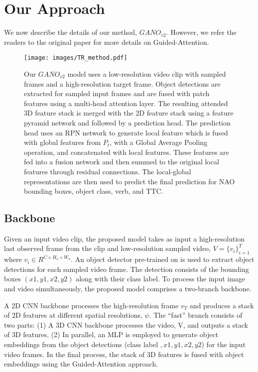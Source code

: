 \documentclass[10pt,twocolumn,letterpaper]{article}
\begin{document}
\section{Our Approach}
\label{sec:pagestyle}
We now describe the details of our method, $GANO_{v2}$. However, we refer the readers to the original paper \cite{gano} for more details on Guided-Attention. 

\begin{figure*}[t!]
\centering
\texttt{[image: images/TR\_method.pdf]}
\caption{Our $GANO_{v2}$ model uses a low-resolution video clip with sampled frames and a high-resolution target frame. Object detections are extracted for sampled input frames and are fused with patch features using a multi-head attention layer. The resulting attended 3D feature stack is merged with the 2D feature stack using a feature pyramid network and followed by a prediction head. The prediction head uses an RPN network to generate local feature which is fused with global features from $P_t$, with a Global Average Pooling operation, and concatenated with local features. These features are fed into a fusion network and then summed to the original local features through residual connections. The local-global representations are then used to predict the final prediction for NAO bounding boxes, object class, verb, and TTC. 
}
\label{fig:method}
\end{figure*}

\subsection{Backbone}
Given an input video clip, the proposed model takes as input a high-resolution last observed frame from the clip and low-resolution sampled video, $V = \{{v_i\}^T_{i=1}}$ where $v_i \in {R}^{C\times{H_o}\times{W_o}}$. An object detector \cite{fastercnn} pre-trained on \cite{ego4d} is used to extract object detections for each sampled video frame. The detection consists of the bounding boxes $(x1, y1, x2, y2)$ along with their class label. 
To process the input image and video simultaneously, the proposed model comprises a two-branch backbone.

A 2D CNN backbone processes the high-resolution frame $v_T$ and produces a stack of 2D features at different spatial resolutions, $\psi$. 
The ``fast'' branch consists of two parts:  (1) A 3D CNN backbone processes the video, V, and outputs a stack of 3D features. (2) In parallel, an MLP is employed to generate object embeddings from the object detections (class label $, x1, y1, x2, y2$) for the input video frames.  
In the final process, the stack of 3D features is fused with object embeddings using the Guided-Attention approach. 
\end{document}
